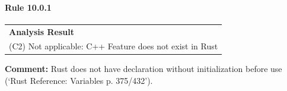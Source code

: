 \paragraph{Rule 10.0.1}
\begin{longtable}{p{13cm}}
\textbf{Analysis Result} \\
(C2) Not applicable: C++ Feature does not exist in Rust \\
\end{longtable}
\textbf{Comment:} Rust does not have declaration without initialization before use (`Rust Reference: Variables p. 375/432'). \\
